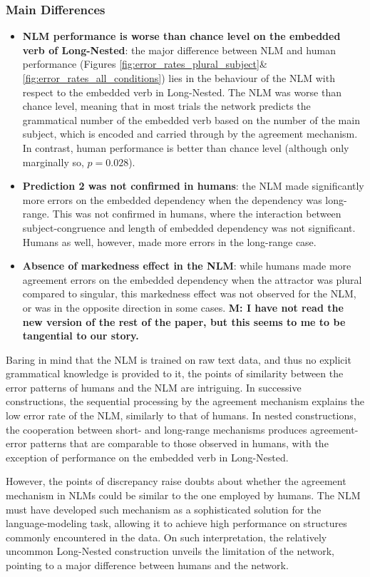 \subsubsection{Main Differences}
    \begin{itemize}
        \item \textbf{NLM performance is worse than chance level on the embedded verb of Long-Nested}: the major difference between NLM and human performance (Figures \ref{fig:error_rates_plural_subject}\&\ref{fig:error_rates_all_conditions}) lies in the behaviour of the NLM with respect to the embedded verb in Long-Nested. The NLM was worse than chance level, meaning that in most trials the network predicts the grammatical number of the embedded verb based on the number of the main subject, which is encoded and carried through by the agreement mechanism. In contrast, human performance is better than chance level (although only marginally so, $p = 0.028$).
        \item \textbf{Prediction 2 was not confirmed in humans}: the NLM made significantly more errors on the embedded dependency when the dependency was long-range. This was not confirmed in humans, where the interaction between subject-congruence and length of embedded dependency was not significant. Humans as well, however, made more errors in the long-range case.
        \item \textbf{Absence of markedness effect in the NLM}: while humans made more agreement errors on the embedded dependency when the attractor was plural compared to singular, this markedness effect was not observed for the NLM, or was in the opposite direction in some cases. \textbf{M: I have not read the new version of the rest of the paper, but this seems to me to be tangential to our story.}
    \end{itemize}
    

Baring in mind that the NLM is trained on raw text data, and thus no explicit grammatical knowledge is provided to it, the points of similarity between the error patterns of humans and the NLM are intriguing. In successive constructions, the sequential processing by the agreement mechanism explains the low error rate of the NLM, similarly to that of humans. In nested constructions, the cooperation between short- and long-range mechanisms produces agreement-error patterns that are comparable to those observed in humans, with the exception of performance on the embedded verb in Long-Nested. 

However, the points of discrepancy raise doubts about whether the agreement mechanism in NLMs could be similar to the one employed by humans. The NLM must have developed such mechanism as a sophisticated solution for the language-modeling task, allowing it to achieve high performance on structures commonly encountered in the data. On such interpretation, the relatively uncommon Long-Nested  construction unveils the limitation of the network, pointing to a major difference between humans and the network.

